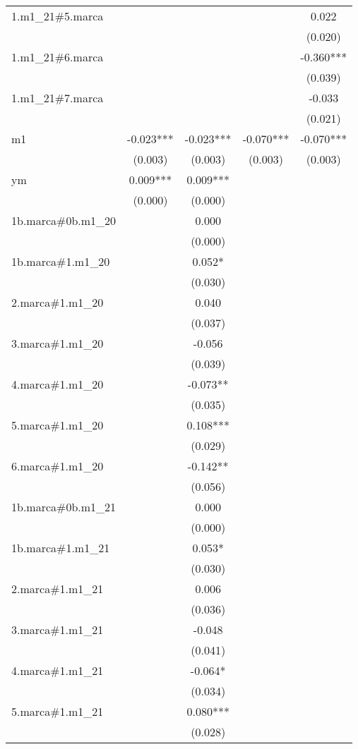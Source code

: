 \begin{tabular}{lcccc}
1.m1\_21\#5.marca &  &  &  & 0.022 \\
 &  &  &  & (0.020) \\
1.m1\_21\#6.marca &  &  &  & -0.360*** \\
 &  &  &  & (0.039) \\
1.m1\_21\#7.marca &  &  &  & -0.033 \\
 &  &  &  & (0.021) \\
m1 & -0.023*** & -0.023*** & -0.070*** & -0.070*** \\
 & (0.003) & (0.003) & (0.003) & (0.003) \\
ym & 0.009*** & 0.009*** &  &  \\
 & (0.000) & (0.000) &  &  \\
1b.marca\#0b.m1\_20 &  & 0.000 &  &  \\
 &  & (0.000) &  &  \\
1b.marca\#1.m1\_20 &  & 0.052* &  &  \\
 &  & (0.030) &  &  \\
2.marca\#1.m1\_20 &  & 0.040 &  &  \\
 &  & (0.037) &  &  \\
3.marca\#1.m1\_20 &  & -0.056 &  &  \\
 &  & (0.039) &  &  \\
4.marca\#1.m1\_20 &  & -0.073** &  &  \\
 &  & (0.035) &  &  \\
5.marca\#1.m1\_20 &  & 0.108*** &  &  \\
 &  & (0.029) &  &  \\
6.marca\#1.m1\_20 &  & -0.142** &  &  \\
 &  & (0.056) &  &  \\
1b.marca\#0b.m1\_21 &  & 0.000 &  &  \\
 &  & (0.000) &  &  \\
1b.marca\#1.m1\_21 &  & 0.053* &  &  \\
 &  & (0.030) &  &  \\
2.marca\#1.m1\_21 &  & 0.006 &  &  \\
 &  & (0.036) &  &  \\
3.marca\#1.m1\_21 &  & -0.048 &  &  \\
 &  & (0.041) &  &  \\
4.marca\#1.m1\_21 &  & -0.064* &  &  \\
 &  & (0.034) &  &  \\
5.marca\#1.m1\_21 &  & 0.080*** &  &  \\
 &  & (0.028) &  &  \\

\end{tabular}
